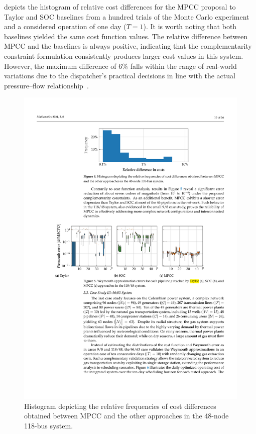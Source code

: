  depicts the histogram of relative cost differences for the MPCC proposal to Taylor and SOC baselines from a hundred trials of the Monte Carlo experiment and a considered operation of one day ($T=1$). It is worth noting that both baselines yielded the same cost function values. The relative difference between MPCC and the baselines is always positive, indicating that the complementarity constraint formulation consistently produces larger cost values in this system. However, the maximum difference of 6\% falls within the range of real-world variations due to the dispatcher's practical decisions in line with the actual pressure--flow relationship~\citep{ZHAO2023129010}. 

\begin{figure}[H]
    \centering
    
   \includegraphics[scale=1]{figures/Chapter_MPCC/g003.pdf}
    \caption{Histogram depicting the relative frequencies of cost differences obtained between MPCC and the other approaches in the 48-node 118-bus system.}
    \label{fig:green_test_cost}
\end{figure}

